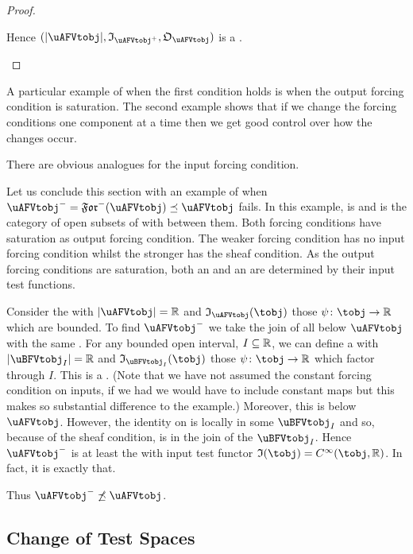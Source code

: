 \documentclass[%
a4paper,%
arxiv,%
defaults
]{myclass}
\begin{document}
\begin{proof}
\begin{enumerate}
Hence \((\forfunc[\uAFVtobj], \itest_{\mMo{\uAFVtobj}}, \otest_{\uAFVtobj})\) is a \uBFVtobjalt. \qedhere
\end{enumerate}
\end{proof}

A particular example of when the first condition holds is when the output forcing condition is saturation.
The second example shows that if we change the forcing conditions one component at a time then we get good control over how the changes occur.

There are obvious analogues for the input forcing condition.

Let us conclude this section with an example of when \(\mJo{\uAFVtobj} = \Jforfunc(\uAFVtobj) \preceq \uAFVtobj\) fails.
In this example, \ucat is \xcat and \tcat is the category of open subsets of \R with \cimaps between them.
Both forcing conditions have saturation as output forcing condition.
The weaker forcing condition has no input forcing condition whilst the stronger has the sheaf condition.
As the output forcing conditions are saturation, both an \uAFVtobjalt and an \uBFVtobjalt are determined by their input test functions.

Consider the \uAFVtobjalt[\uAFVtobj] with \(\forfunc[\uAFVtobj] = \R\) and \(\itest_{\uAFVtobj}(\tobj)\) those \cimaps \(\ifn \colon \tobj \to \R\) which are bounded.
To find \(\mJo{\uAFVtobj}\) we take the join of all \uBFVtobjalts below \(\uAFVtobj\) with the same \uobj.
For any bounded open interval, \(I \subseteq \mathbb{R}\), we can define a \uBFVtobjalt[\uBFVtobj_I] with \(\forfunc[\uBFVtobj_I] = \R\) and \(\itest_{\uBFVtobj_I}(\tobj)\) those \cimaps \(\ifn \colon \tobj \to \R\) which factor through \(I\).
This is a \uBFVtobjalt.
(Note that we have not assumed the constant forcing condition on inputs, if we had we would have to include constant maps but this makes so substantial difference to the example.)
Moreover, this \uBFVtobjalt is below \(\uAFVtobj\).
However, the identity on \R is locally in some \(\uBFVtobj_I\) and so, because of the sheaf condition, is in the join of the \(\uBFVtobj_I\).
Hence \(\mJo{\uAFVtobj}\) is at least the \uBFVtobjalt with input test functor \(\itest(\tobj) = \Ci(\tobj,\R)\).
In fact, it is exactly that.

Thus \(\mJo{\uAFVtobj} \not\preceq \uAFVtobj\).



\subsection{Change of Test Spaces}
\end{document}
